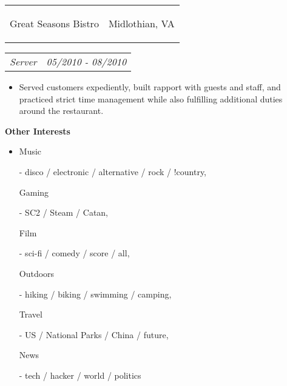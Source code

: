 \documentclass[11pt]{article}
\makeatletter
\newcommand{\headerrow}[2]
{\begin{tabular*}{\linewidth}{l@{\extracolsep{\fill}}r}
	#1 &
	#2 \\
\end{tabular*}}
\makeatother
\begin{document}
\vspace{-0.3em}

\headerrow
	{\begin{Large}Great Seasons Bistro\end{Large}}
	{Midlothian, VA}
\headerrow
	{\textit{Server}}
	{\textit{05/2010 - 08/2010}}
	
\vspace{-0.6em}
\begin{itemize}
	\item Served customers expediently, built rapport with guests and staff, and practiced strict time management while also fulfilling additional duties around the restaurant.
\end{itemize}

\vspace{-0.3em}

\begin{LARGE}
	\bf Other Interests
\end{LARGE}

\vspace{-0.5em}

\begin{itemize}
	\item \begin{bf}Music\end{bf} - disco / electronic / alternative / rock / !country, \begin{bf}Gaming\end{bf} - SC2 / Steam / Catan, \begin{bf}Film\end{bf} - sci-fi / comedy / score / all, \begin{bf}Outdoors\end{bf} - hiking / biking / swimming / camping, \begin{bf}Travel\end{bf} - US / National Parks / China / future, \begin{bf}News\end{bf} - tech / hacker / world / politics
\end{itemize}
\end{document}
